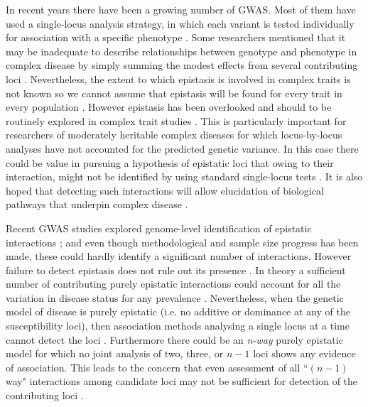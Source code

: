 In recent years there have been a growing number of GWAS.
Most of them have used a single-locus analysis strategy, in which each variant is tested individually for association with a specific phenotype \cite{cordell2009detecting}.
Some researchers mentioned that it may be inadequate to describe relationships between genotype and phenotype in complex disease by simply summing the modest effects from several contributing loci \cite{culverhouse2002perspective}.
Nevertheless, the extent to which epistasis is involved in complex traits is not known so we cannot assume that epistasis will be found for every trait in every population \cite{carlborg2004epistasis}.
However epistasis has been overlooked and should to be routinely explored in complex trait studies \cite{carlborg2004epistasis}.
This is particularly important for researchers of moderately heritable complex diseases for which locus-by-locus analyses have not accounted for the predicted genetic variance.
In this case there could be value in pursuing a hypothesis of epistatic loci \cite{culverhouse2002perspective} that owing to their interaction, might not be identified by using standard single-locus tests \cite{cordell2009detecting}.
It is also hoped that detecting such interactions will allow elucidation of biological pathways that underpin complex disease \cite{cordell2009detecting}.

Recent GWAS studies explored genome-level identification of epistatic interactions \cite{ackermann2012systematic}; and even though methodological and sample size progress has been made, these could hardly identify a significant number of interactions. 
However failure to detect epistasis does not rule out its presence \cite{zuk2012mystery}.
In theory a sufficient number of contributing purely epistatic interactions could account for all the variation in disease status for any prevalence \cite{culverhouse2002perspective}.
Nevertheless, when the genetic model of disease is purely epistatic (i.e. no additive or dominance at any of the susceptibility loci), then association methods analysing a single locus at a time cannot detect the loci \cite{culverhouse2002perspective}.
Furthermore there could be an \textit{n-way} purely epistatic model for which no joint analysis of two, three, or $n-1$ loci shows any evidence of association.
This leads to the concern that even assessment of all ``$(n-1)$ way" interactions among candidate loci may not be sufficient for detection of the contributing loci \cite{culverhouse2002perspective}.

